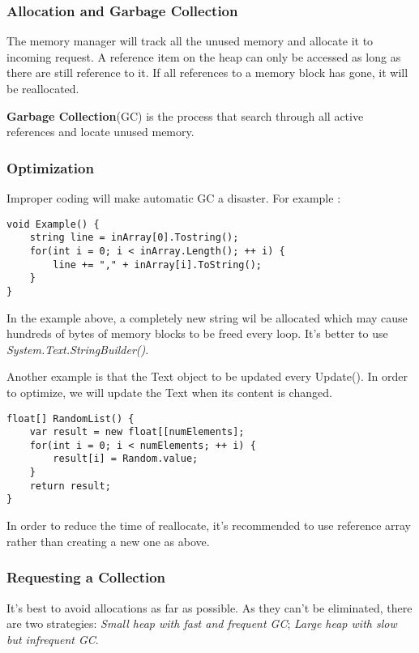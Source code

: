 \documentclass[10pt, a4paper]{article}
\begin{document}
            \subsubsection{Allocation and Garbage Collection}
                The memory manager will track all the unused memory and allocate it to incoming request. A reference item on the heap can only be accessed as long as there are still reference to it. If all references to a memory block has gone, it will be reallocated.

                \textbf{Garbage Collection}(GC) is the process that search through all active references and locate unused memory. 
            \subsubsection{Optimization}
                Improper coding will make automatic GC a disaster. For example : 
\begin{lstlisting}
void Example() {
    string line = inArray[0].Tostring(); 
    for(int i = 0; i < inArray.Length(); ++ i) {
        line += "," + inArray[i].ToString();
    }
}
\end{lstlisting}           

                In the example above, a completely new string wil be allocated which may cause hundreds of bytes of memory blocks to be freed every loop. It's better to use \emph{System.Text.StringBuilder()}.

                Another example is that the Text object to be updated every Update(). In order to optimize, we will update the Text when its content is changed. 
            
\begin{lstlisting}
float[] RandomList() {
    var result = new float[[numElements]; 
    for(int i = 0; i < numElements; ++ i) {
        result[i] = Random.value; 
    }
    return result; 
}
\end{lstlisting} 

                In order to reduce the time of reallocate, it's recommended to use reference array rather than creating a new one as above. 
            
            \subsubsection{Requesting a Collection}
                It's best to avoid allocations as far as possible. As they can't be eliminated, there are two strategies: \emph{Small heap with fast and frequent GC}; \emph{Large heap with slow but infrequent GC}. 
\end{document}
